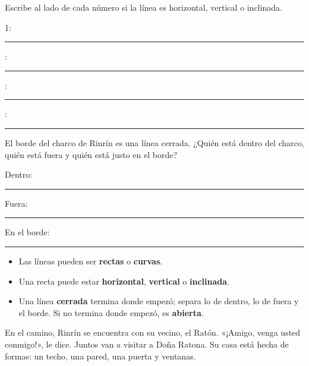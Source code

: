 \documentclass[11pt]{article}
\begin{document}
\begin{preguntas}
\pregunta Escribe al lado de cada número si la línea es horizontal,
vertical o inclinada.
\begin{center}
\end{center}
1: \rule{2.4cm}{0.4pt} : \rule{2.4cm}{0.4pt} : \rule{2.4cm}{0.4pt} : \rule{2.4cm}{0.4pt}

\pregunta El borde del charco de Rinrín es una línea cerrada. ¿Quién está
dentro del charco, quién está fuera y quién está justo en el borde?
\begin{center}
\end{center}
Dentro: \rule{2.8cm}{0.4pt} \quad Fuera: \rule{2.8cm}{0.4pt} \quad
En el borde: \rule{2.8cm}{0.4pt}
\end{preguntas}

\begin{resumen}
\begin{itemize}
  \item Las líneas pueden ser \textbf{rectas} o \textbf{curvas}.
  \item Una recta puede estar \textbf{horizontal}, \textbf{vertical} o \textbf{inclinada}.
  \item Una línea \textbf{cerrada} termina donde empezó; separa lo de dentro,
        lo de fuera y el borde. Si no termina donde empezó, es \textbf{abierta}.
\end{itemize}
\end{resumen}

\label{tema:figuras}

\begin{hilo}
En el camino, Rinrín se encuentra con su vecino, el Ratón. «¡Amigo, venga
usted conmigo!», le dice. Juntos van a visitar a Doña Ratona. Su casa está
hecha de formas: un techo, una pared, una puerta y ventanas.
\end{hilo}
\end{document}

